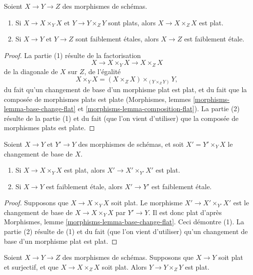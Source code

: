 \begin{lemma}
\label{lemma-composition-weakly-etale}
Soient $X \to Y \to Z$ des morphismes de schémas.
\begin{enumerate}
\item Si $X \to X \times_Y X$ et $Y \to Y \times_Z Y$ sont plats,
alors $X \to X \times_Z X$ est plat.
\item Si $X \to Y$ et $Y \to Z$ sont faiblement \'etales, alors
$X \to Z$ est faiblement \'etale.
\end{enumerate}
\end{lemma}

\begin{proof}
La partie (1) résulte de la factorisation
$$
X \to X \times_Y X \to X \times_Z X
$$
de la diagonale de $X$ sur $Z$, de l'égalité
$$
X \times_Y X = (X \times_Z X) \times_{(Y \times_Z Y)} Y,
$$
du fait qu'un changement de base d'un morphisme plat est plat, et
du fait que la composée de morphismes plats est plate
(Morphismes, lemmes \ref{morphisms-lemma-base-change-flat} et
\ref{morphisms-lemma-composition-flat}).
La partie (2) résulte de la partie (1) et du fait (que l'on vient d'utiliser)
que la composée de morphismes plats est plate.
\end{proof}

\begin{lemma}
\label{lemma-base-change-weakly-etale}
Soient $X \to Y$ et $Y' \to Y$ des morphismes de schémas, et soit
$X' = Y' \times_Y X$ le changement de base de $X$.
\begin{enumerate}
\item Si $X \to X \times_Y X$ est plat, alors $X' \to X' \times_{Y'} X'$
est plat.
\item Si $X \to Y$ est faiblement \'etale, alors $X' \to Y'$ est faiblement \'etale.
\end{enumerate}
\end{lemma}

\begin{proof}
Supposons que $X \to X \times_Y X$ soit plat. Le morphisme $X' \to X' \times_{Y'} X'$
est le changement de base de $X \to X \times_Y X$ par $Y' \to Y$. Il
est donc plat d'après Morphismes, lemme \ref{morphisms-lemma-base-change-flat}.
Ceci démontre (1). La partie (2) résulte de (1) et du fait (que l'on vient d'utiliser)
qu'un changement de base d'un morphisme plat est plat.
\end{proof}

\begin{lemma}
\label{lemma-go-down}
Soient $X \to Y \to Z$ des morphismes de schémas. Supposons que $X \to Y$ soit
plat et surjectif, et que $X \to X \times_Z X$ soit plat.
Alors $Y \to Y \times_Z Y$ est plat.
\end{lemma}


